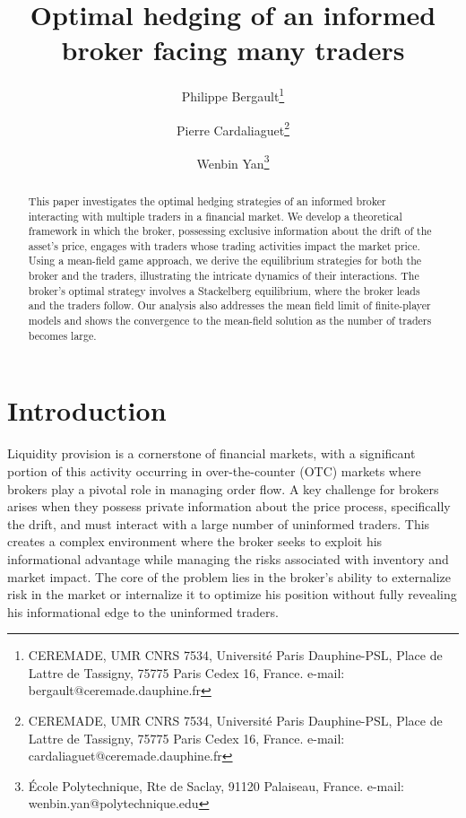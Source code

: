 \documentclass[10pt]{article}
\title{Optimal hedging of an informed broker facing many traders}
\author{Philippe Bergault\thanks{CEREMADE, UMR CNRS 7534, Universit\'e Paris Dauphine-PSL,
Place de Lattre de Tassigny, 75775 Paris Cedex 16, France. e-mail: bergault@ceremade.dauphine.fr} \and 
Pierre Cardaliaguet\thanks{CEREMADE, UMR CNRS 7534, Universit\'e Paris Dauphine-PSL,
Place de Lattre de Tassigny, 75775 Paris Cedex 16, France. e-mail: cardaliaguet@ceremade.dauphine.fr}\and 
Wenbin Yan\thanks{École Polytechnique, Rte de Saclay, 91120 Palaiseau, France. e-mail: wenbin.yan@polytechnique.edu}}
\begin{document}
\maketitle

\begin{abstract}
    This paper investigates the optimal hedging strategies of an informed broker interacting with multiple traders in a financial market. We develop a theoretical framework in which the broker, possessing exclusive information about the drift of the asset's price, engages with traders whose trading activities impact the market price. Using a mean-field game approach, we derive the equilibrium strategies for both the broker and the traders, illustrating the intricate dynamics of their interactions. The broker's optimal strategy involves a Stackelberg equilibrium, where the broker leads and the traders follow. Our analysis also addresses the mean field limit of finite-player models and shows the convergence to the mean-field solution as the number of traders becomes large.

\medskip
{} 
\end{abstract}

\tableofcontents


\section{Introduction}

Liquidity provision is a cornerstone of financial markets, with a significant portion of this activity occurring in over-the-counter (OTC) markets where brokers play a pivotal role in managing order flow. A key challenge for brokers arises when they possess private information about the price process, specifically the drift, and must interact with a large number of uninformed traders. This creates a complex environment where the broker seeks to exploit his informational advantage while managing the risks associated with inventory and market impact. The core of the problem lies in the broker’s ability to externalize risk in the market or internalize it to optimize his position without fully revealing his informational edge to the uninformed traders.\\
\end{document}
